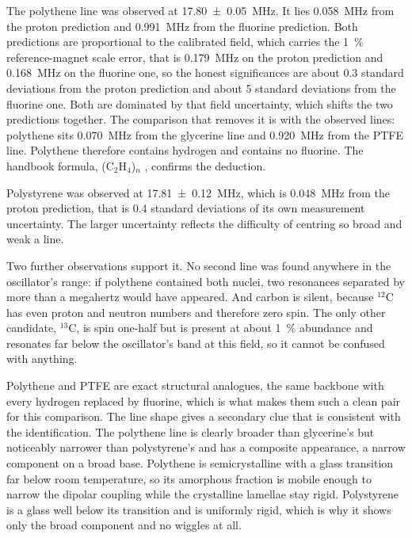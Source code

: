 \documentclass[11pt,a4paper]{article}
\begin{document}
The polythene line was observed at \SI{17.80 \pm 0.05}{\mega\hertz}. It lies
\SI{0.058}{\mega\hertz}
from the proton prediction and \SI{0.991}{\mega\hertz} from the fluorine prediction. Both
predictions are proportional to the calibrated field, which carries the \SI{1}{\percent}
reference-magnet scale error, that is \SI{0.179}{\mega\hertz} on the proton prediction and
\SI{0.168}{\mega\hertz} on the fluorine one, so the honest significances are about 0.3 standard
deviations from the proton prediction and about 5 standard deviations from the fluorine one. Both
are dominated by that field uncertainty, which shifts the two predictions together. The
comparison that removes it is with the observed lines: polythene sits \SI{0.070}{\mega\hertz}
from the glycerine line and \SI{0.920}{\mega\hertz} from the PTFE line. Polythene therefore
contains hydrogen and contains no fluorine. The handbook formula, (C$_2$H$_4$)$_n$
\cite{crc}, confirms the deduction.

Polystyrene was observed at \SI{17.81 \pm 0.12}{\mega\hertz}, which is \SI{0.048}{\mega\hertz}
from the proton prediction, that is 0.4 standard deviations of its own measurement uncertainty.
The larger uncertainty reflects the difficulty of centring so broad and weak a line.

Two further observations support it. No second line was found anywhere in the oscillator's range:
if polythene contained both nuclei, two resonances separated by more than a megahertz would have
appeared. And carbon is silent, because $^{12}$C has even proton and neutron numbers and therefore
zero spin. The only other candidate, $^{13}$C, is spin one-half but is present at about
\SI{1}{\percent} abundance and resonates far below the oscillator's band at this field, so it
cannot be confused with anything.

Polythene and PTFE are exact structural analogues, the same backbone with every hydrogen replaced
by fluorine, which is what makes them such a clean pair for this comparison. The line shape gives a
secondary clue that is consistent with the identification. The polythene line is clearly broader
than glycerine's but noticeably narrower than polystyrene's and has a composite appearance, a
narrow component on a broad base. Polythene is semicrystalline with a glass transition far below
room temperature, so its amorphous fraction is mobile enough to narrow the dipolar coupling while
the crystalline lamellae stay rigid. Polystyrene is a glass well below its transition and is
uniformly rigid, which is why it shows only the broad component and no wiggles at all.
\end{document}
